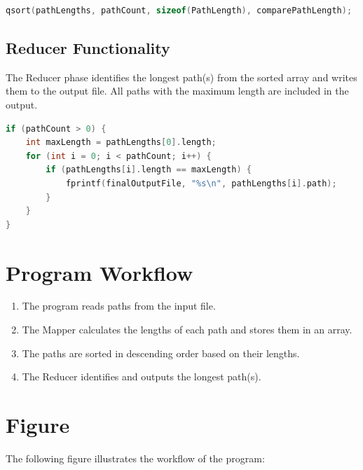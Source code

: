 \documentclass[12pt]{article}
\begin{document}
\begin{lstlisting}[language=C, caption=Sorting Phase]
qsort(pathLengths, pathCount, sizeof(PathLength), comparePathLength);
\end{lstlisting}

\subsection*{Reducer Functionality}
The Reducer phase identifies the longest path(s) from the sorted array and writes them to the output file. All paths with the maximum length are included in the output.

\begin{lstlisting}[language=C, caption=Reducer Phase]
if (pathCount > 0) {
    int maxLength = pathLengths[0].length;
    for (int i = 0; i < pathCount; i++) {
        if (pathLengths[i].length == maxLength) {
            fprintf(finalOutputFile, "%s\n", pathLengths[i].path);
        }
    }
}
\end{lstlisting}

\section*{Program Workflow}

\begin{enumerate}
    \item The program reads paths from the input file.
    \item The Mapper calculates the lengths of each path and stores them in an array.
    \item The paths are sorted in descending order based on their lengths.
    \item The Reducer identifies and outputs the longest path(s).
\end{enumerate}

\section*{Figure}
The following figure illustrates the workflow of the program:
\end{document}
